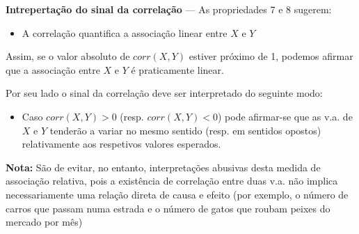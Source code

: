 \noindent \textbf{Intrepertação do sinal da correlação} --- As propriedades 7 e 8 sugerem:
\begin{itemize}
    \item A correlação quantifica a associação linear entre $X$ e $Y$
\end{itemize}
\noindent Assim, se o valor absoluto de $corr(X,Y)$ estiver próximo de 1, podemos afirmar que a associação entre $X$ e $Y$ é praticamente linear.

\vspace{1 em}
\noindent Por seu lado o sinal da correlação deve ser interpretado do seguinte modo:
\begin{itemize}
    \item Caso $corr(X,Y) > 0$ (resp. $corr(X,Y) < 0$) pode afirmar-se que as v.a. de $X$ e $Y$ tenderão a variar no mesmo sentido (resp. em sentidos opostos) relativamente aos respetivos valores esperados.
\end{itemize}

\noindent \textbf{Nota:} São de evitar, no entanto, interpretações abusivas desta medida de associação relativa, pois a existência de correlação entre duas v.a. não implica necessariamente uma relação direta de causa e efeito (por exemplo, o número de carros que passam numa estrada e o número de gatos que roubam peixes do mercado por mês)
